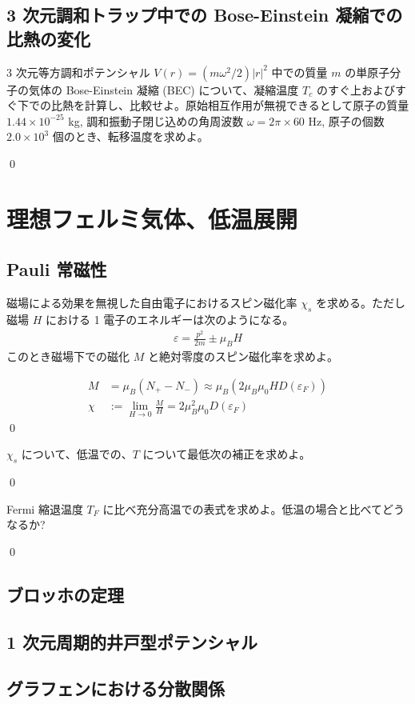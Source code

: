 \documentclass[uplatex,dvipdfmx,a4paper,11pt]{jlreq}
\makeatletter
\numberwithin{equation}{section}
\theoremstyle{definition}
\renewenvironment{proof}[1][\proofname]{\par
  \normalfont
  \topsep6\p@\@plus6\p@ \trivlist
  \item[\hskip\labelsep{\bfseries #1}\@addpunct{\bfseries}]\ignorespaces\quad\par
}{%
  \qed\endtrivlist\@endpefalse
}
\renewcommand\proofname{証明}
\makeatother
\begin{document}
\setcounter{subsection}{6}
\subsection{3 次元調和トラップ中での Bose-Einstein 凝縮での比熱の変化}
\begin{problem}
3 次元等方調和ポテンシャル $V(r) = (m\omega^2/2)|r|^2$ 中での質量 $m$ の単原子分子の気体の Bose-Einstein 凝縮 (BEC) について、凝縮温度 $T_c$ のすぐ上およびすぐ下での比熱を計算し、比較せよ。原始相互作用が無視できるとして原子の質量 $1.44 \times 10^{-25}$ kg, 調和振動子閉じ込めの角周波数 $\omega =2π \times 60$ Hz, 原子の個数 $2.0 \times 10^3$ 個のとき、転移温度を求めよ。
\end{problem}
\begin{proof}

\end{proof}

\section{理想フェルミ気体、低温展開}
\subsection{Pauli 常磁性}
\begin{problem}
磁場による効果を無視した自由電子におけるスピン磁化率 $\chi_s$ を求める。ただし磁場 $H$ における 1 電子のエネルギーは次のようになる。
\begin{align}
  \varepsilon = \frac{p^2}{2m} \pm \mu_BH
\end{align}
このとき磁場下での磁化 $M$ と絶対零度のスピン磁化率を求めよ。
\end{problem}
\begin{proof}
  \begin{align}
    M    & = \mu_B(N_+ - N_-) \approx \mu_B(2\mu_B\mu_0HD(\varepsilon_F)) \\
    \chi & := \lim_{H\to 0}\frac{M}{H} = 2\mu_B^2\mu_0D(\varepsilon_F)
  \end{align}
\end{proof}

\begin{problem}
$\chi_s$ について、低温での、$T$ について最低次の補正を求めよ。
\end{problem}
\begin{proof}

\end{proof}

\begin{problem}
Fermi 縮退温度 $T_F$ に比べ充分高温での表式を求めよ。低温の場合と比べてどうなるか?
\end{problem}
\begin{proof}

\end{proof}

\subsection{ブロッホの定理}

\subsection{1 次元周期的井戸型ポテンシャル}

\subsection{グラフェンにおける分散関係}
\end{document}
